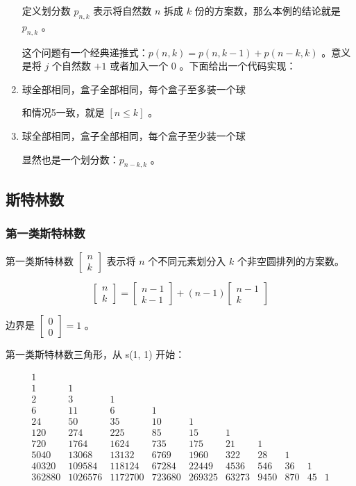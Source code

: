 \documentclass{article}
\begin{document}
\begin{enumerate}
    定义划分数 $p_{n,k}$ 表示将自然数 $n$ 拆成 $k$ 份的方案数，那么本例的结论就是 $p_{n,k}$ 。

    这个问题有一个经典递推式：$p(n,k) = p(n,k-1) + p(n-k,k)$ 。意义是将 $j$ 个自然数 $+1$ 或者加入一个 $0$ 。下面给出一个代码实现：

    

    \item 球全部相同，盒子全部相同，每个盒子至多装一个球

    和情况5一致，就是 $[n\leq k]$ 。

    \item 球全部相同，盒子全部相同，每个盒子至少装一个球

    显然也是一个划分数：$p_{n-k,k}$ 。
\end{enumerate}

\subsection{斯特林数}
\subsubsection{第一类斯特林数}

第一类斯特林数 $\begin{bmatrix}n\\k\end{bmatrix}$ 表示将 $n$ 个不同元素划分入 $k$ 个非空圆排列的方案数。

$$
\begin{bmatrix}
n \\ k
\end{bmatrix}
=
\begin{bmatrix}
n-1 \\ k-1
\end{bmatrix}
+
(n-1)\begin{bmatrix}
n-1 \\ k
\end{bmatrix}
$$

边界是 $\begin{bmatrix}0\\0\end{bmatrix}=1$ 。

第一类斯特林数三角形，从 s(1, 1) 开始：

$$
\begin{matrix}
1 \\
1 & 1 \\
2 & 3 & 1 \\
6 & 11 & 6 & 1 \\
24 & 50 & 35 & 10 & 1 \\
120 & 274 & 225 & 85 & 15 & 1 \\
720 & 1764 & 1624 & 735 & 175 & 21 & 1 \\
5040 & 13068 & 13132 & 6769 & 1960 & 322 & 28 & 1 \\
40320 & 109584 & 118124 & 67284 & 22449 & 4536 & 546 & 36 & 1 \\
362880 & 1026576 & 1172700 & 723680 & 269325 & 63273 & 9450 & 870 & 45 & 1 \\
\end{matrix}
$$
\end{document}
